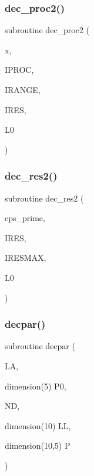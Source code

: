 \mbox{\label{sophia_8f_aa3b0701079e090328e78a236c355785c}} 
\subsubsection{\texorpdfstring{dec\+\_\+proc2()}{dec\_proc2()}}
{\footnotesize\ttfamily subroutine dec\+\_\+proc2 (\begin{DoxyParamCaption}\item[{}]{x,  }\item[{}]{I\+P\+R\+OC,  }\item[{}]{I\+R\+A\+N\+GE,  }\item[{}]{I\+R\+ES,  }\item[{}]{L0 }\end{DoxyParamCaption})}

\mbox{\label{sophia_8f_a1f10866338ba407c5a39963ea43afc6e}} 
\subsubsection{\texorpdfstring{dec\+\_\+res2()}{dec\_res2()}}
{\footnotesize\ttfamily subroutine dec\+\_\+res2 (\begin{DoxyParamCaption}\item[{}]{eps\+\_\+prime,  }\item[{}]{I\+R\+ES,  }\item[{}]{I\+R\+E\+S\+M\+AX,  }\item[{}]{L0 }\end{DoxyParamCaption})}

\mbox{\label{sophia_8f_a9e00005d1f5d0ef7dbe87b5fc90f5091}} 
\subsubsection{\texorpdfstring{decpar()}{decpar()}}
{\footnotesize\ttfamily subroutine decpar (\begin{DoxyParamCaption}\item[{}]{LA,  }\item[{dimension(5)}]{P0,  }\item[{}]{ND,  }\item[{dimension(10)}]{LL,  }\item[{dimension(10,5)}]{P }\end{DoxyParamCaption})}

